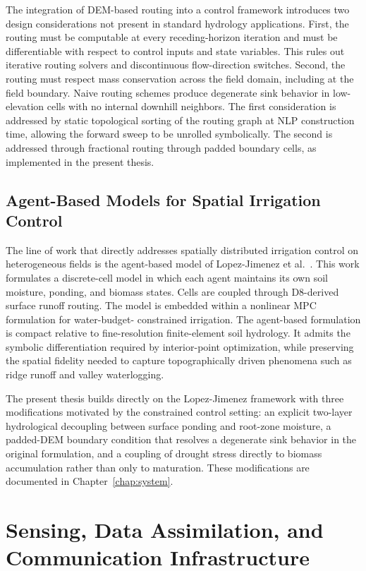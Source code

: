 The integration of DEM-based routing into a control framework
introduces two design considerations not present in standard
hydrology applications. First, the routing must be computable at
every receding-horizon iteration and must be differentiable with
respect to control inputs and state variables. This rules out
iterative routing solvers and discontinuous flow-direction switches.
Second, the routing must respect mass conservation across the field
domain, including at the field boundary. Naive routing schemes
produce degenerate sink behavior in low-elevation cells with no
internal downhill neighbors. The first consideration is addressed by
static topological sorting of the routing graph at NLP construction
time, allowing the forward sweep to be unrolled symbolically. The
second is addressed through fractional routing through padded
boundary cells, as implemented in the present thesis.

\subsection{Agent-Based Models for Spatial Irrigation Control}
\label{ssec:lit-abm}

The line of work that directly addresses spatially distributed
irrigation control on heterogeneous fields is the agent-based model
of Lopez-Jimenez et al.~\cite{Lopezjimenez2024,LopezJimenez2022}.
This work formulates a discrete-cell model in which each agent
maintains its own soil moisture, ponding, and biomass states. Cells
are coupled through D8-derived surface runoff routing. The model is
embedded within a nonlinear MPC formulation for water-budget-
constrained irrigation. The agent-based formulation is compact
relative to fine-resolution finite-element soil hydrology. It admits
the symbolic differentiation required by interior-point optimization,
while preserving the spatial fidelity needed to capture
topographically driven phenomena such as ridge runoff and valley
waterlogging.

The present thesis builds directly on the Lopez-Jimenez framework
with three modifications motivated by the constrained control
setting: an explicit two-layer hydrological decoupling between
surface ponding and root-zone moisture, a padded-DEM boundary
condition that resolves a degenerate sink behavior in the original
formulation, and a coupling of drought stress directly to biomass
accumulation rather than only to maturation. These modifications are
documented in Chapter~\ref{chap:system}.

\section{Sensing, Data Assimilation, and Communication Infrastructure}
\label{sec:lit-sensing}

